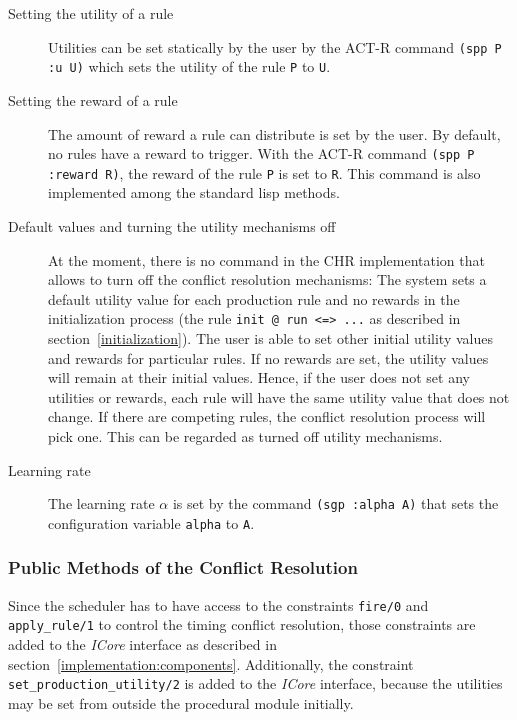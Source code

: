 \begin{description}
 \item[Setting the utility of a rule] Utilities can be set statically by the user by the ACT-R command \lstinline|(spp P :u U)| which sets the utility of the rule \lstinline|P| to \lstinline|U|.
 \item[Setting the reward of a rule] The amount of reward a rule can distribute is set by the user. By default, no rules have a reward to trigger. With the ACT-R command \lstinline|(spp P :reward R)|, the reward of the rule \lstinline|P| is set to \lstinline|R|. This command is also implemented among the standard lisp methods.  
 \item[Default values and turning the utility mechanisms off] At the moment, there is no command in the CHR implementation that allows to turn off the conflict resolution mechanisms: The system sets a default utility value for each production rule and no rewards in the initialization process (the rule \lstinline|init @ run <=> ...| as described in section~\ref{initialization}). The user is able to set other initial utility values and rewards for particular rules. If no rewards are set, the utility values will remain at their initial values. Hence, if the user does not set any utilities or rewards, each rule will have the same utility value that does not change. If there are competing rules, the conflict resolution process will pick one. This can be regarded as turned off utility mechanisms.
 \item[Learning rate] The learning rate $\alpha$ is set by the command \lstinline|(sgp :alpha A)| that sets the configuration variable \lstinline|alpha| to \lstinline|A|.
\end{description}

\subsubsection{Public Methods of the Conflict Resolution}
\label{implementation:icore_interface}

Since the scheduler has to have access to the constraints \lstinline|fire/0| and \lstinline|apply_rule/1| to control the timing conflict resolution, those constraints are added to the \emph{ICore} interface as described in section~\ref{implementation:components}. Additionally, the constraint \lstinline|set_production_utility/2| is added to the \emph{ICore} interface, because the utilities may be set from outside the procedural module initially.

